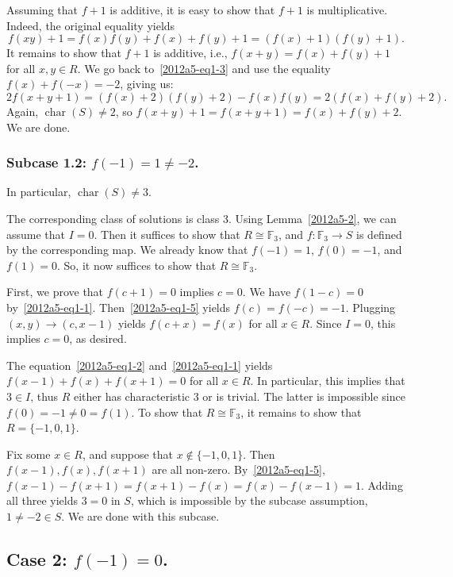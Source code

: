 \documentclass{article}
\newcommand{\F}{\mathbb{F}}
\DeclareMathOperator{\rchar}{char}
\begin{document}
Assuming that $f + 1$ is additive, it is easy to show that $f + 1$ is multiplicative.
Indeed, the original equality yields
\[ f(xy) + 1 = f(x) f(y) + f(x) + f(y) + 1 = (f(x) + 1)(f(y) + 1). \]
It remains to show that $f + 1$ is additive, i.e., $f(x + y) = f(x) + f(y) + 1$ for all $x, y \in R$.
We go back to~\eqref{2012a5-eq1-3} and use the equality $f(x) + f(-x) = -2$, giving us:
\[ 2 f(x + y + 1) = (f(x) + 2) (f(y) + 2) - f(x) f(y) = 2 (f(x) + f(y) + 2). \]
Again, $\rchar(S) \neq 2$, so $f(x + y) + 1 = f(x + y + 1) = f(x) + f(y) + 2$.
We are done.


\subsubsection*{Subcase 1.2: $f(-1) = 1 \neq -2$.}

In particular, $\rchar(S) \neq 3$.

The corresponding class of solutions is class 3.
Using Lemma~\ref{2012a5-2}, we can assume that $I = 0$.
Then it suffices to show that $R \cong \F_3$, and $f : \F_3 \to S$ is defined by the corresponding map.
We already know that $f(-1) = 1$, $f(0) = -1$, and $f(1) = 0$.
So, it now suffices to show that $R \cong \F_3$.

First, we prove that $f(c + 1) = 0$ implies $c = 0$.
We have $f(1 - c) = 0$ by~\eqref{2012a5-eq1-1}.
Then~\eqref{2012a5-eq1-5} yields $f(c) = f(-c) = -1$.
Plugging $(x, y) \to (c, x - 1)$ yields $f(c + x) = f(x)$ for all $x \in R$.
Since $I = 0$, this implies $c = 0$, as desired.

The equation~\eqref{2012a5-eq1-2} and~\eqref{2012a5-eq1-1} yields $f(x - 1) + f(x) + f(x + 1) = 0$ for all $x \in R$.
In particular, this implies that $3 \in I$, thus $R$ either has characteristic $3$ or is trivial.
The latter is impossible since $f(0) = -1 \neq 0 = f(1)$.
To show that $R \cong \F_3$, it remains to show that $R = \{-1, 0, 1\}$.

Fix some $x \in R$, and suppose that $x \notin \{-1, 0, 1\}$.
Then $f(x - 1), f(x), f(x + 1)$ are all non-zero.
By~\eqref{2012a5-eq1-5}, $f(x - 1) - f(x + 1) = f(x + 1) - f(x) = f(x) - f(x - 1) = 1$.
Adding all three yields $3 = 0$ in $S$, which is impossible by the subcase assumption, $1 \neq -2 \in S$.
We are done with this subcase.



\subsection*{Case 2: $f(-1) = 0$.}
\end{document}

